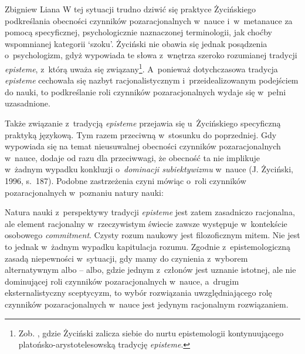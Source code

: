 \begin{artplenv}{Zbigniew Liana}
W tej sytuacji trudno dziwić się praktyce Życińskiego podkreślania obecności czynników pozaracjonalnych w~nauce i~w~metanauce
za pomocą specyficznej, psychologicznie naznaczonej terminologii, jak choćby wspomnianej kategorii `szoku'.
Życiński nie obawia się jednak posądzenia o~psychologizm, gdyż wypowiada te słowa z~wnętrza szeroko rozumianej tradycji
\textit{episteme}, z~którą uważa się związany\footnote{Zob.
\parencite*[s.~126]{zycinski_elementy_1996},
gdzie Życiński zalicza siebie do nurtu epistemologii kontynuującego platońsko-arystotelesowską
tradycję \textit{episteme}.}. A~ponieważ dotychczasowa tradycja \textit{episteme} cechowała się nazbyt racjonalistycznym i~przeidealizowanym
podejściem do nauki, to podkreślanie roli czynników pozaracjonalnych wydaje się w~pełni uzasadnione.

Także związanie z~tradycją \textit{episteme} przejawia się u~Życińskiego specyficzną praktyką językową. Tym razem
przeciwną w~stosunku do poprzedniej. Gdy wypowiada się na temat nieusuwalnej obecności czynników pozaracjonalnych w~nauce,
dodaje od razu  dla przeciwwagi, że obecność ta nie implikuje w~żadnym wypadku konkluzji o~\textit{dominacji
subiektywizmu} w~nauce \label{ref:RND5RKyXkJozz}(J. Życiński, 1996, s.~187). Podobne zastrzeżenia czyni  mówiąc o~roli
czynników pozaracjonalnych w~poznaniu natury nauki:


Natura nauki z~perspektywy tradycji \textit{episteme} jest zatem zasadniczo racjonalna, ale element racjonalny w~rzeczywistym
świecie zawsze występuje w~kontekście osobowego \textit{commitment}. Czysty rozum naukowy jest filozoficznym
mitem. Nie jest to jednak w~żadnym wypadku kapitulacja rozumu. Zgodnie z~epistemologiczną zasadą niepewności w~sytuacji,
gdy mamy do czynienia z~wyborem alternatywnym albo -- albo, gdzie jednym z~członów jest uznanie istotnej, ale
nie dominującej roli czynników pozaracjonalnych w~nauce, a~drugim eksternalistyczny sceptycyzm, to wybór rozwiązania
uwzględniającego rolę czynników pozaracjonalnych w~nauce jest jedynym racjonalnym rozwiązaniem.






\end{artplenv}
